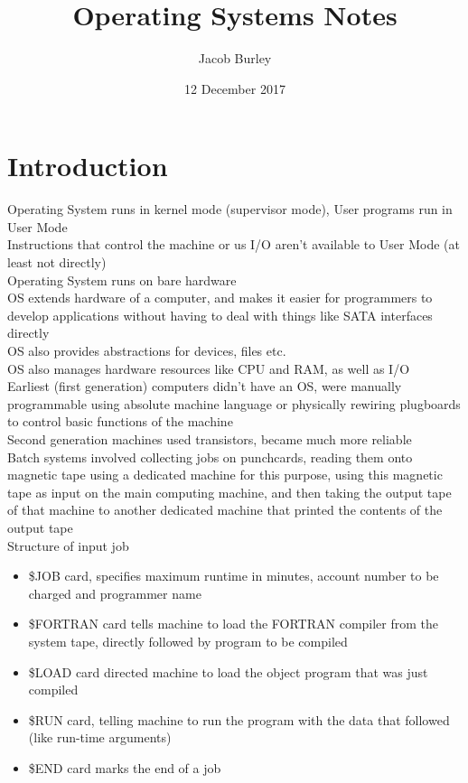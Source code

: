 \documentclass{article}
\title{Operating Systems Notes}
\author{Jacob Burley} %
\date{12 December 2017}
\begin{document}

\maketitle
\section{Introduction}
Operating System runs in kernel mode (supervisor mode), User programs run in User Mode
\\Instructions that control the machine or us I/O aren't available to User Mode (at least not directly)
\\Operating System runs on bare hardware
\\OS extends hardware of a computer, and makes it easier for programmers to develop applications without having to deal with things like SATA interfaces directly
\\OS also provides abstractions for devices, files etc.
\\OS also manages hardware resources like CPU and RAM, as well as I/O
\\Earliest (first generation) computers didn't have an OS, were manually programmable using absolute machine language or physically rewiring plugboards to control basic functions of the machine
\\Second generation machines used transistors, became much more reliable
\\Batch systems involved collecting jobs on punchcards, reading them onto magnetic tape using a dedicated machine for this purpose, using this magnetic tape as input on the main computing machine, and then taking the output tape of that machine to another dedicated machine that printed the contents of the output tape
\\Structure of input job
\begin{itemize}
	\item \$JOB card, specifies maximum runtime in minutes, account number to be charged and programmer name
	\item \$FORTRAN card tells machine to load the FORTRAN compiler from the system tape, directly followed by program to be compiled
	\item \$LOAD card directed machine to load the object program that was just compiled
	\item \$RUN card, telling machine to run the program with the data that followed (like run-time arguments)
	\item \$END card marks the end of a job
\end{itemize}
\end{document}
